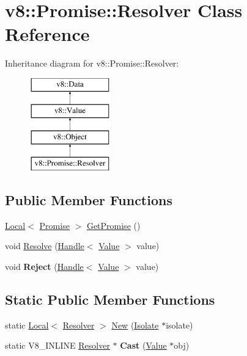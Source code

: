 \hypertarget{classv8_1_1Promise_1_1Resolver}{\section{v8\-:\-:Promise\-:\-:Resolver Class Reference}
\label{classv8_1_1Promise_1_1Resolver}
}
Inheritance diagram for v8\-:\-:Promise\-:\-:Resolver\-:\begin{figure}[H]
\begin{center}
\leavevmode
\includegraphics[height=4.000000cm]{classv8_1_1Promise_1_1Resolver}
\end{center}
\end{figure}
\subsection*{Public Member Functions}
\begin{DoxyCompactItemize}
\item 
\hyperlink{classv8_1_1Local}{Local}$<$ \hyperlink{classv8_1_1Promise}{Promise} $>$ \hyperlink{classv8_1_1Promise_1_1Resolver_a41fd1ffef546a62e363a639935fc8ae3}{Get\-Promise} ()
\item 
void \hyperlink{classv8_1_1Promise_1_1Resolver_aa1f7f6883d57879a7956e84e63b2d935}{Resolve} (\hyperlink{classv8_1_1Handle}{Handle}$<$ \hyperlink{classv8_1_1Value}{Value} $>$ value)
\item 
\hypertarget{classv8_1_1Promise_1_1Resolver_a12b1f6ef41dd7d759443631135502847}{void {\bfseries Reject} (\hyperlink{classv8_1_1Handle}{Handle}$<$ \hyperlink{classv8_1_1Value}{Value} $>$ value)}\label{classv8_1_1Promise_1_1Resolver_a12b1f6ef41dd7d759443631135502847}

\end{DoxyCompactItemize}
\subsection*{Static Public Member Functions}
\begin{DoxyCompactItemize}
\item 
static \hyperlink{classv8_1_1Local}{Local}$<$ \hyperlink{classv8_1_1Promise_1_1Resolver}{Resolver} $>$ \hyperlink{classv8_1_1Promise_1_1Resolver_a80b9e402b6b49f41d57d404ed9e00c9d}{New} (\hyperlink{classv8_1_1Isolate}{Isolate} $\ast$isolate)
\item 
\hypertarget{classv8_1_1Promise_1_1Resolver_ab2b541cb210158ed0c757c8b7dc46279}{static V8\-\_\-\-I\-N\-L\-I\-N\-E \hyperlink{classv8_1_1Promise_1_1Resolver}{Resolver} $\ast$ {\bfseries Cast} (\hyperlink{classv8_1_1Value}{Value} $\ast$obj)}\label{classv8_1_1Promise_1_1Resolver_ab2b541cb210158ed0c757c8b7dc46279}

\end{DoxyCompactItemize}


